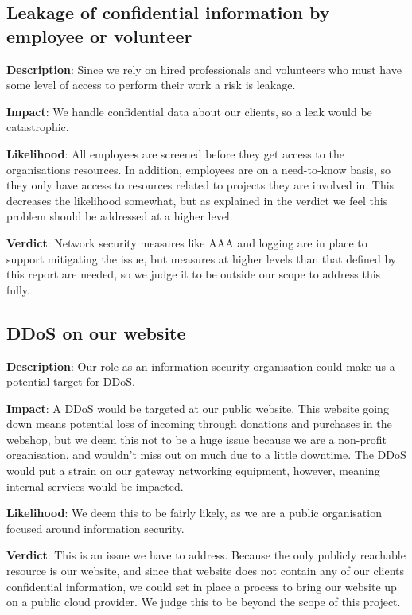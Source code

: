 \subsection{Leakage of confidential information by employee or volunteer}

\textbf{Description}: Since we rely on hired professionals and volunteers who must have some level of access to perform their work a risk is leakage.

\textbf{Impact}: We handle confidential data about our clients, so a leak would be catastrophic.

\textbf{Likelihood}: All employees are screened before they get access to the organisations resources. In addition, employees are on a need-to-know basis, so they only have access to resources related to projects they are involved in. This decreases the likelihood somewhat, but as explained in the verdict we feel this problem should be addressed at a higher level.

\textbf{Verdict}: Network security measures like AAA and logging are in place to support mitigating the issue, but measures at higher levels than that defined by this report are needed, so we judge it to be outside our scope to address this fully.

\subsection{DDoS on our website}

\textbf{Description}: Our role as an information security organisation could make us a potential target for DDoS.

\textbf{Impact}: A DDoS would be targeted at our public website. This website going down means potential loss of incoming through donations and purchases in the webshop, but we deem this not to be a huge issue because we are a non-profit organisation, and wouldn't miss out on much due to a little downtime. The DDoS would put a strain on our gateway networking equipment, however, meaning internal services would be impacted.

\textbf{Likelihood}: We deem this to be fairly likely, as we are a public organisation focused around information security.

\textbf{Verdict}: This is an issue we have to address. Because the only publicly reachable resource is our website, and since that website does not contain any of our clients confidential information, we could set in place a process to bring our website up on a public cloud provider. We judge this to be beyond the scope of this project.


